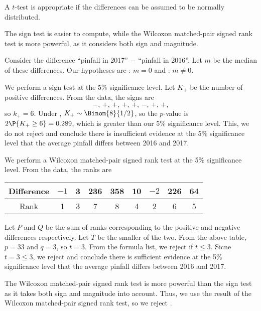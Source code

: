 \begin{solution}
    \begin{ppart}
        A $t$-test is appropriate if the differences can be assumed to be normally distributed.
    \end{ppart}
    \begin{ppart}
        The sign test is easier to compute, while the Wilcoxon matched-pair signed rank test is more powerful, as it considers both sign and magnitude.
    \end{ppart}
    \begin{ppart}
        Consider the difference ``pinfall in 2017'' $-$ ``pinfall in 2016''. Let $m$ be the median of these differences. Our hypotheses are \nullhyp: $m = 0$ and \althyp: $m \neq 0$.
    \end{ppart}
    \begin{ppart}
        We perform a sign test at the 5\% significance level. Let $K_+$ be the number of positive differences. From the data, the signs are \[-, \, +, \, +, \, +, \, +, \, -, \, +, \, +,\] so $k_+ = 6$. Under \nullhyp, $K_+ \sim \Binom{8}{1/2}$, so the $p$-value is $2\P{K_+ \geq 6} = 0.289$, which is greater than our 5\% significance level. This, we do not reject \nullhyp{} and conclude there is insufficient evidence at the 5\% significance level that the average pinfall differs between 2016 and 2017.
    \end{ppart}
    \begin{ppart}
        We perform a Wilcoxon matched-pair signed rank test at the 5\% significance level. From the data, the ranks are
        \begin{table}[H]
            \centering
            \begin{tabular}{|c|c|c|c|c|c|c|c|c|}
            \hline
            Difference & $-1$ & 3 & 236 & 358 & 10 & $-2$ & 226 & 64 \\ \hline
            Rank & 1 & 3 & 7 & 8 & 4 & 2 & 6 & 5 \\ \hline
            \end{tabular}
        \end{table}
        Let $P$ and $Q$ be the sum of ranks corresponding to the positive and negative differences respectively. Let $T$ be the smaller of the two. From the above table, $p = 33$ and $q = 3$, so $t = 3$. From the formula list, we reject \nullhyp{} if $t \leq 3$. Sicne $t = 3 \leq 3$, we reject \nullhyp{} and conclude there is sufficient evidence at the 5\% significance level that the average pinfall differs between 2016 and 2017.
    \end{ppart}
    \begin{ppart}
        The Wilcoxon matched-pair signed rank test is more powerful than the sign test as it takes both sign and magnitude into account. Thus, we use the result of the Wilcoxon matched-pair signed rank test, so we reject \nullhyp.
    \end{ppart}
\end{solution}

